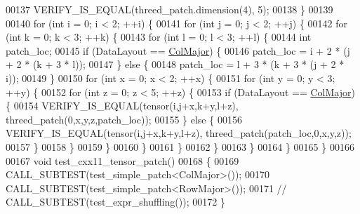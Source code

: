 \begin{DoxyCode}
00137     VERIFY\_IS\_EQUAL(threed\_patch.dimension(4), 5);
00138   \}
00139 
00140   \textcolor{keywordflow}{for} (\textcolor{keywordtype}{int} i = 0; i < 2; ++i) \{
00141     \textcolor{keywordflow}{for} (\textcolor{keywordtype}{int} j = 0; j < 2; ++j) \{
00142       \textcolor{keywordflow}{for} (\textcolor{keywordtype}{int} k = 0; k < 3; ++k) \{
00143         \textcolor{keywordflow}{for} (\textcolor{keywordtype}{int} l = 0; l < 3; ++l) \{
00144           \textcolor{keywordtype}{int} patch\_loc;
00145           \textcolor{keywordflow}{if} (DataLayout == \hyperlink{group__enums_ggaacded1a18ae58b0f554751f6cdf9eb13a0cbd4bdd0abcfc0224c5fcb5e4f6669a}{ColMajor}) \{
00146             patch\_loc = i + 2 * (j + 2 * (k + 3 * l));
00147           \} \textcolor{keywordflow}{else} \{
00148             patch\_loc = l + 3 * (k + 3 * (j + 2 * i));
00149           \}
00150           \textcolor{keywordflow}{for} (\textcolor{keywordtype}{int} x = 0; x < 2; ++x) \{
00151             \textcolor{keywordflow}{for} (\textcolor{keywordtype}{int} y = 0; y < 3; ++y) \{
00152               \textcolor{keywordflow}{for} (\textcolor{keywordtype}{int} z = 0; z < 5; ++z) \{
00153                 \textcolor{keywordflow}{if} (DataLayout == \hyperlink{group__enums_ggaacded1a18ae58b0f554751f6cdf9eb13a0cbd4bdd0abcfc0224c5fcb5e4f6669a}{ColMajor}) \{
00154                   VERIFY\_IS\_EQUAL(tensor(i,j+x,k+y,l+z), threed\_patch(0,x,y,z,patch\_loc));
00155                 \} \textcolor{keywordflow}{else} \{
00156                   VERIFY\_IS\_EQUAL(tensor(i,j+x,k+y,l+z), threed\_patch(patch\_loc,0,x,y,z));
00157                 \}
00158               \}
00159             \}
00160           \}
00161         \}
00162       \}
00163     \}
00164   \}
00165 \}
00166 
00167 \textcolor{keywordtype}{void} test\_cxx11\_tensor\_patch()
00168 \{
00169    CALL\_SUBTEST(test\_simple\_patch<ColMajor>());
00170    CALL\_SUBTEST(test\_simple\_patch<RowMajor>());
00171    \textcolor{comment}{//   CALL\_SUBTEST(test\_expr\_shuffling());}
00172 \}
\end{DoxyCode}

